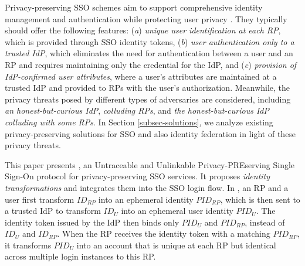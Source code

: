 Privacy-preserving SSO schemes aim to support comprehensive identity management and authentication
 while protecting user privacy \cite{maler2008venn, NIST2017draft, BrowserID, SPRESSO}.
They typically should offer the following features:
(\emph{a}) \emph{unique user identification at each RP}, which is provided through SSO identity tokens,
(\emph{b}) \emph{user authentication only to a trusted IdP},
 which eliminates the need for authentication between a user and an RP and requires maintaining only the credential for the IdP,
and (\emph{c}) \emph{provision of IdP-confirmed user attributes}, 
 where a user's attributes are maintained at a trusted IdP and provided to RPs with the user's authorization.
 Meanwhile, the privacy threats posed by different types of adversaries are considered, including \emph{an honest-but-curious IdP}, \emph{colluding RPs}, and \emph{the honest-but-curious IdP colluding with some RPs}.
In Section \ref{subsec-solutions}, we analyze existing privacy-preserving solutions for SSO and also identity federation in light of these privacy threats.


This paper presents \usso, an Untraceable and Unlinkable Privacy-PREserving Single Sign-On protocol for privacy-preserving SSO services. It proposes {\em identity transformations} and integrates them into the SSO login flow.
In \usso, an RP and a user first transform $ID_{RP}$ into an ephemeral identity $PID_{RP}$, which is then sent to a trusted IdP to transform $ID_U$ into an ephemeral user identity $PID_U$.
The identity token issued by the IdP then binds only $PID_U$ and $PID_{RP}$, instead of $ID_U$ and $ID_{RP}$. When the RP receives the identity token with a matching $PID_{RP}$, it transforms $PID_U$ into an account that is unique at each RP but identical across multiple login instances to this RP.


